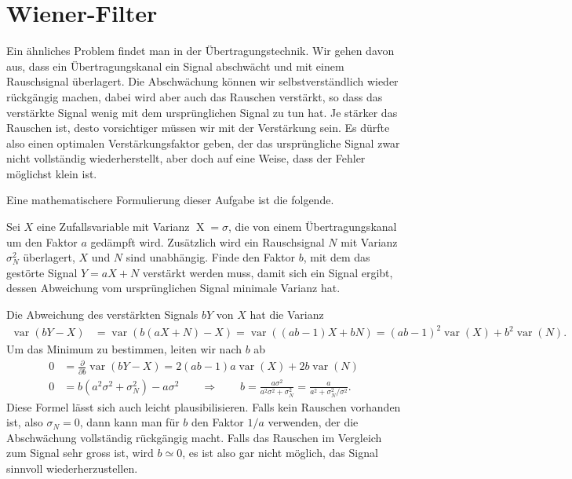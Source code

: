 %
%
%
\section{Wiener-Filter
\label{section:wiener-filter}}
Ein ähnliches Problem findet man in der Übertragungstechnik.
Wir gehen davon aus, dass ein Übertragungskanal ein Signal abschwächt
und mit einem Rauschsignal überlagert.
Die Abschwächung können wir selbstverständlich wieder rückgängig
machen, dabei wird aber auch das Rauschen verstärkt, so dass das
verstärkte Signal wenig mit dem ursprünglichen Signal zu tun hat.
Je stärker das Rauschen ist, desto vorsichtiger müssen wir mit
der Verstärkung sein.
Es dürfte also einen optimalen Verstärkungsfaktor geben, der 
das ursprüngliche Signal zwar nicht vollständig wiederherstellt, 
aber doch auf eine Weise, dass der Fehler möglichst klein ist.

Eine mathematischere Formulierung dieser Aufgabe ist die folgende.

\begin{aufgabe}
Sei $X$ eine Zufallsvariable mit Varianz $\operatorname{X}=\sigma$,
die von einem Übertragungskanal um den Faktor $a$ gedämpft wird.
Zusätzlich wird ein Rauschsignal $N$ mit Varianz $\sigma_N^2$ überlagert,
$X$ und $N$ sind unabhängig.
Finde den Faktor $b$, mit dem das gestörte Signal $Y=aX+N$ verstärkt werden
muss, damit sich ein Signal ergibt, dessen Abweichung vom ursprünglichen Signal
minimale Varianz hat.
\end{aufgabe}

Die Abweichung des verstärkten Signals $bY$ von $X$ hat die Varianz
\begin{align*}
\operatorname{var}(bY-X)
&=
\operatorname{var}(b(aX+N)-X)
=
\operatorname{var}((ab-1)X+bN)
=
(ab-1)^2 \operatorname{var}(X) + b^2\operatorname{var}(N).
\end{align*}
Um das Minimum zu bestimmen, leiten wir nach $b$ ab
\begin{align*}
0
&=
\frac{\partial}{\partial b} \operatorname{var}(bY-X)
=
2(ab-1)a \operatorname{var}(X) +2b\operatorname{var}(N)
\\
0&=
b(a^2\sigma^2 + \sigma_N^2) - a\sigma^2
\qquad\Rightarrow\qquad
b
=
\frac{a\sigma^2}{a^2\sigma^2+\sigma_N^2}
=
\frac{a}{a^2+\sigma_N^2/\sigma^2}.
\end{align*}
Diese Formel lässt sich auch leicht plausibilisieren.
Falls kein Rauschen vorhanden ist, also $\sigma_N=0$, dann kann
man für $b$ den Faktor $1/a$ verwenden, der die Abschwächung
vollständig rückgängig macht.
Falls das Rauschen im Vergleich zum Signal sehr gross ist, wird
$b\simeq 0$, es ist also gar nicht möglich, das Signal sinnvoll
wiederherzustellen.

